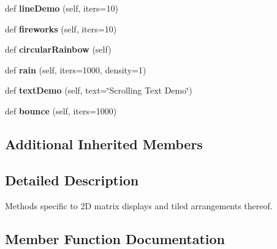 \begin{DoxyCompactItemize}
\item 
\mbox{\label{classglowbit_1_1glowbitMatrix_a0071fd8471e5f519586f6fdd86f8d7f3}} 
def {\bfseries line\+Demo} (self, iters=10)
\item 
\mbox{\label{classglowbit_1_1glowbitMatrix_a69370ec1479b4887fca517fbefd92e4c}} 
def {\bfseries fireworks} (self, iters=10)
\item 
\mbox{\label{classglowbit_1_1glowbitMatrix_adf29bdb4294bcf27ae560130b0fcae35}} 
def {\bfseries circular\+Rainbow} (self)
\item 
\mbox{\label{classglowbit_1_1glowbitMatrix_a690a172f923caeb55e3adf012ec0600c}} 
def {\bfseries rain} (self, iters=1000, density=1)
\item 
\mbox{\label{classglowbit_1_1glowbitMatrix_a6232220b12c86c7ec361cde374419ac4}} 
def {\bfseries text\+Demo} (self, text=\char`\"{}Scrolling Text Demo\char`\"{})
\item 
\mbox{\label{classglowbit_1_1glowbitMatrix_a969352871a02db3d55bcabe5b5107574}} 
def {\bfseries bounce} (self, iters=1000)
\end{DoxyCompactItemize}
\subsection*{Additional Inherited Members}


\subsection{Detailed Description}
Methods specific to 2D matrix displays and tiled arrangements thereof. 



\subsection{Member Function Documentation}
\mbox{\label{classglowbit_1_1glowbitMatrix_ab67885d63f392afa061c8455de3e31ba}} 

